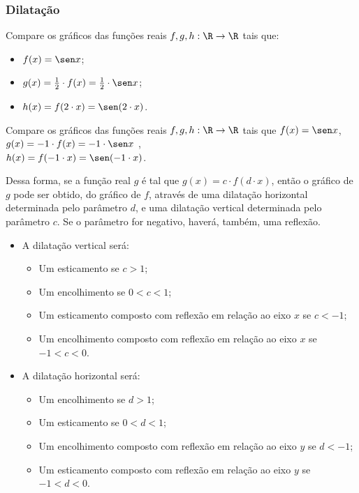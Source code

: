 \subsubsection{Dilatação}

\begin{example}
  Compare os gráficos das funções reais $f, g , h: \R \to \R$ tais que:
  \begin{itemize}
    \item $f(x) = \sen x$;
    \item $g(x) = \frac 1 2 \cdot f(x)  = \frac 1 2 \cdot \sen x $;
    \item $h(x)= f(2 \cdot x)= \sen (2 \cdot x)$.
  \end{itemize}

  \begin{center}
    
  \end{center}
  \begin{center}
    
  \end{center}
\end{example}

\begin{example}
Compare os gráficos das funções reais $f, g , h: \R \to \R$ tais que
$f(x) = \sen x$, \\ $g(x) = -1 \cdot f(x)  = -1 \cdot \sen x $ , \\
$h(x)= f(-1 \cdot x)= \sen (-1 \cdot x)$.
\end{example}

Dessa forma, se a função real $g$ é tal que $g(x) = c \cdot f(d
\cdot x)$, então o gráfico de $g$ pode ser obtido, do gráfico de
$f$, através de uma dilatação horizontal determinada pelo parâmetro
$d$, e uma dilatação vertical determinada pelo parâmetro $c$. Se o
parâmetro for negativo, haverá, também, uma reflexão.
\begin{itemize}
  \item A dilatação vertical será:
        \begin{itemize}
          \item Um esticamento se $c>1$;
          \item Um encolhimento se $0<c<1$;
          \item Um esticamento composto com reflexão em relação ao eixo $x$ se $c<-1$;
          \item Um encolhimento composto com reflexão em relação ao eixo $x$ se
          $-1<c<0$.
        \end{itemize}
  \item A dilatação horizontal será:
        \begin{itemize}
          \item Um encolhimento se $d>1$;
          \item Um esticamento se $0<d<1$;
          \item Um encolhimento composto com reflexão em relação ao eixo $y$ se $d<-1$;
          \item Um esticamento composto com reflexão em relação ao eixo $y$ se
          $-1<d<0$.
        \end{itemize}
\end{itemize}

